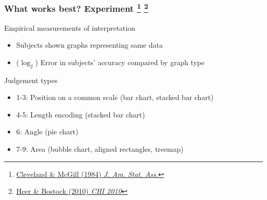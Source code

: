 
\begin{frame}
  \frametitle{What works best? Experiment
  \footnote{\tiny{\href{https://www.jstor.org/stable/2288400}{Cleveland \& McGill (1984) \textit{J. Am. Stat. Ass.}}}}  
  \footnote{\tiny{\href{http://vis.stanford.edu/files/2010-MTurk-CHI.pdf}{Heer \& Bostock (2010) \textit{CHI 2010}}}}
  }
    \textcolor{hutton_green}{Empirical measurements of interpretation}
    \begin{itemize}  
      \item Subjects shown graphs representing same data
      \item ($\log_2$) Error in subjects' accuracy compared by graph type
    \end{itemize}  
    \begin{alertblock}{Judgement types}
      \begin{itemize}
        \item 1-3: Position on a common scale (bar chart, stacked bar chart)
        \item 4-5: Length encoding (stacked bar chart)
        \item 6: Angle (pie chart)
        \item 7-9: Area (bubble chart, aligned rectangles, treemap) 
      \end{itemize}
    \end{alertblock}
\end{frame}

